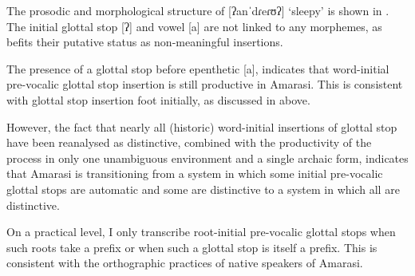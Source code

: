 The prosodic and morphological structure of 
[ʔanˈdɾeɾʊʔ] `sleepy' is shown in .
The initial glottal stop [ʔ] and vowel [a] are not linked to any morphemes,
as befits their putative status as non-meaningful insertions.

\begin{exe}
\end{exe}

The presence of a glottal stop before epenthetic [a],
indicates that word-initial pre-vocalic glottal
stop insertion is still productive in Amarasi.
This is consistent with glottal stop insertion foot initially,
as discussed in  above.

However, the fact that nearly all (historic) word-initial insertions
of glottal stop have been reanalysed as distinctive,
combined with the productivity of the process
in only one unambiguous environment and a single archaic form,
indicates that Amarasi is transitioning from a system in which
some initial pre-vocalic glottal stops are automatic and some are distinctive
to a system in which all are distinctive.

On a practical level, I only transcribe root-initial
pre-vocalic glottal stops when such roots take a prefix
or when such a glottal stop is itself a prefix.
This is consistent with the orthographic practices
of native speakers of Amarasi.
